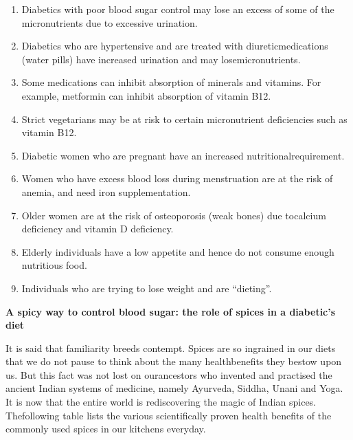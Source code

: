 \vspace{-\topsep}
\begin{enumerate}[•]
\itemsep=0pt
\item Diabetics with poor blood sugar control may lose an excess of some of the micronutrients due to excessive urination.
\item Diabetics who are hypertensive and are treated with diuretic\break medications (water pills) have increased urination and may lose\break micronutrients.
\item Some medications can inhibit absorption of minerals and vitamins. For example, metformin can inhibit absorption of vitamin B12.
\item Strict vegetarians may be at risk to certain micronutrient defici\-encies such as vitamin B12.
\item Diabetic women who are pregnant have an increased nutritional\break requirement.
\item Women who have excess blood loss during menstruation are at the risk of anemia, and need iron supplementation.
\item Older women are at the risk of osteoporosis (weak bones) due to\break calcium deficiency and vitamin D deficiency.
\item Elderly individuals have a low appetite and hence do not consume enough nutritious food.
\item Individuals who are trying to lose weight and are “dieting”.
\end{enumerate}

\noindent\textbf{A spicy way to control blood sugar: the role of spices in a diabetic’s diet}

It is said that familiarity breeds contempt. Spices are so ingrained in our diets that we do not pause to think about the many health\break benefits they bestow upon us. But this fact was not lost on our\break ancestors who invented and practised the ancient Indian systems of medicine, namely Ayurveda, Siddha, Unani and Yoga. It is now that the entire world is rediscovering the magic of Indian spices. The\break following table lists the various scientifically proven health benefits of the commonly used spices in our kitchens everyday.

